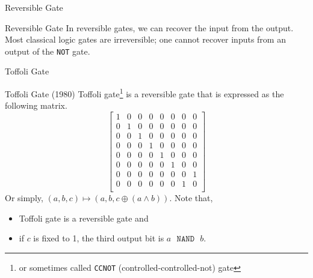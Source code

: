 \documentclass{beamer}
\newcommand{\ttt}[1]{\texttt{#1}}
\newcommand{\mtt}[1]{\mathtt{#1}}
\renewcommand{\:}{\text{ }}
\begin{document}
    \begin{frame}{Reversible Gate}
        \begin{block}{Reversible Gate}
            In \alert{reversible gates}, we can recover the input from the output.
            Most classical logic gates are irreversible; one cannot recover inputs from an output of the \ttt{NOT} gate.
        \end{block}
    \end{frame}

    \begin{frame}{Toffoli Gate}
        \begin{block}{Toffoli Gate (1980)}
            Toffoli gate\footnote{or sometimes called \ttt{CCNOT} (controlled-controlled-not) gate} is a reversible gate that is expressed as the following matrix.
            \scriptsize
            \[
                \begin{bmatrix}
                    1 & 0 & 0 & 0 & 0 & 0 & 0 & 0 \\
                    0 & 1 & 0 & 0 & 0 & 0 & 0 & 0 \\
                    0 & 0 & 1 & 0 & 0 & 0 & 0 & 0 \\
                    0 & 0 & 0 & 1 & 0 & 0 & 0 & 0 \\
                    0 & 0 & 0 & 0 & 1 & 0 & 0 & 0 \\
                    0 & 0 & 0 & 0 & 0 & 1 & 0 & 0 \\
                    0 & 0 & 0 & 0 & 0 & 0 & 0 & 1 \\
                    0 & 0 & 0 & 0 & 0 & 0 & 1 & 0 \\
                \end{bmatrix}
            \] \small
            Or simply, $(a, b, c) \mapsto (a, b, c \oplus (a \land b))$. Note that,\\[-0.2em]
            \begin{itemize}
                \setlength\itemsep{-0.2em}
                \item Toffoli gate is a reversible gate and
                \item if $c$ is fixed to 1, the third output bit is $a \:\mtt{NAND}\: b$.
            \end{itemize}
        \end{block}
        
    \end{frame}
\end{document}
